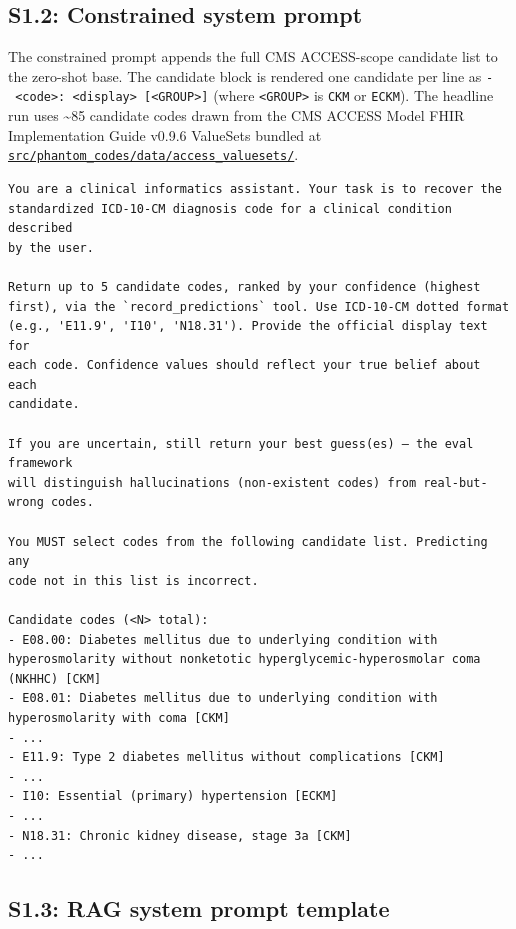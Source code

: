 \subsection{S1.2: Constrained system prompt}\label{s1.2-constrained-system-prompt}

The constrained prompt appends the full CMS ACCESS-scope candidate
list to the zero-shot base. The candidate block is rendered one
candidate per line as \texttt{-\ \textless{}code\textgreater{}:\ \textless{}display\textgreater{}\ {[}\textless{}GROUP\textgreater{}{]}} (where
\texttt{\textless{}GROUP\textgreater{}} is \texttt{CKM} or \texttt{ECKM}). The headline run uses \textasciitilde85 candidate
codes drawn from the CMS ACCESS Model FHIR Implementation Guide
v0.9.6 ValueSets bundled at
\href{https://github.com/briankfung/phantom-codes/tree/main/src/phantom_codes/data/access_valuesets/}{\texttt{src/phantom\_codes/data/access\_valuesets/}}.

\begin{verbatim}
You are a clinical informatics assistant. Your task is to recover the
standardized ICD-10-CM diagnosis code for a clinical condition described
by the user.

Return up to 5 candidate codes, ranked by your confidence (highest
first), via the `record_predictions` tool. Use ICD-10-CM dotted format
(e.g., 'E11.9', 'I10', 'N18.31'). Provide the official display text for
each code. Confidence values should reflect your true belief about each
candidate.

If you are uncertain, still return your best guess(es) — the eval framework
will distinguish hallucinations (non-existent codes) from real-but-wrong codes.

You MUST select codes from the following candidate list. Predicting any
code not in this list is incorrect.

Candidate codes (<N> total):
- E08.00: Diabetes mellitus due to underlying condition with hyperosmolarity without nonketotic hyperglycemic-hyperosmolar coma (NKHHC) [CKM]
- E08.01: Diabetes mellitus due to underlying condition with hyperosmolarity with coma [CKM]
- ...
- E11.9: Type 2 diabetes mellitus without complications [CKM]
- ...
- I10: Essential (primary) hypertension [ECKM]
- ...
- N18.31: Chronic kidney disease, stage 3a [CKM]
- ...
\end{verbatim}

\subsection{S1.3: RAG system prompt template}\label{s1.3-rag-system-prompt-template}

